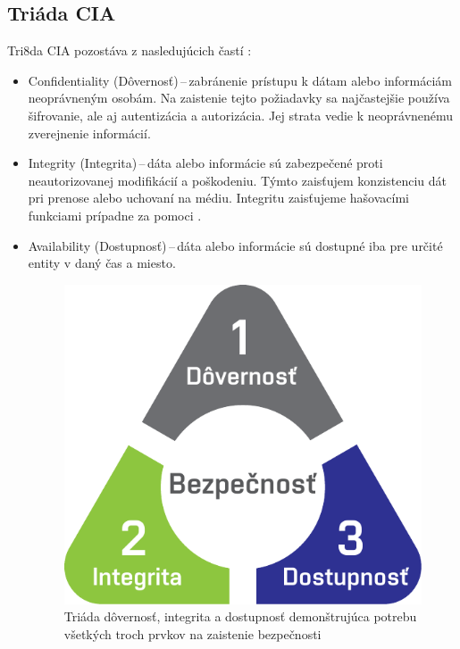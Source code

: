 \subsection{Triáda CIA}
Tri8da CIA pozostáva z nasledujúcich častí \cite{McMillan2018}: 
\begin{itemize}
	\item Confidentiality (Dôvernosť)\,--\,zabránenie prístupu k dátam alebo informáciám neoprávneným osobám. Na zaistenie tejto požiadavky sa najčastejšie používa šifrovanie, ale aj autentizácia a autorizácia. Jej strata vedie k neoprávnenému zverejnenie informácií. 
	
	\item Integrity (Integrita)\,--\,dáta alebo informácie sú zabezpečené proti neautorizovanej modifikácií a poškodeniu. Týmto zaisťujem konzistenciu dát pri prenose alebo uchovaní na médiu. Integritu zaisťujeme hašovacími funkciami prípadne za pomoci . 
	
	\item Availability (Dostupnosť)\,--\,dáta alebo informácie sú dostupné iba pre určité entity v daný čas a miesto. 

	\begin{figure}[!h]
		\begin{center}
			\includegraphics[scale=0.6]{obrazky/cia.pdf}
		\end{center}
		\caption[Triáda dôvernosť, integrita a dostupnosť]{Triáda dôvernosť, integrita a dostupnosť demonštrujúca potrebu všetkých troch prvkov na zaistenie bezpečnosti \cite{Vyncke2008}}%
\label{cia}
\end{figure}
\end{itemize}

